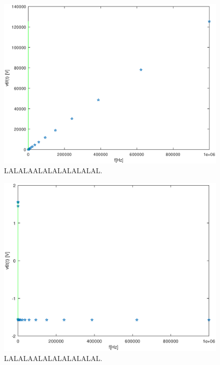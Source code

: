 \begin{figure}[h!] \centering
\includegraphics[width=0.8\linewidth]{magnitude.eps}
\caption{LALALAALALALALALALAL.}
\label{fig:LALALAAL}
\end{figure}

\begin{figure}[h!] \centering
\includegraphics[width=0.8\linewidth]{phase.eps}
\caption{LALALAALALALALALALAL.}
\label{fig:LALALAAL}
\end{figure}

